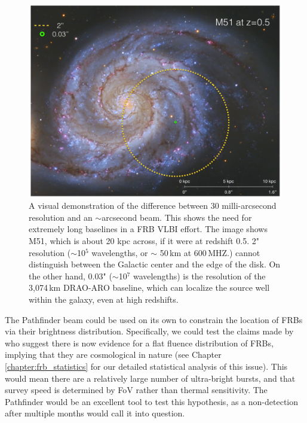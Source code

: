 \begin{figure}[!h]
\begin{center}
\includegraphics[trim={0in, 0in, 0in, 0in}, width=\textwidth]{./figures/beamforming/m51green.jpeg}
\caption[abc]{A visual demonstration of the difference between 
     30 milli-arcsecond resolution and an $\sim$arcsecond beam.
     This shows the need for extremely long baselines 
     in a FRB VLBI effort.
     The image shows M51, which is about 20 kpc across, if it
     were at redshift 0.5. 2" resolution ($\sim$10$^5$ wavelengths, or $\sim$
     50\,km at 600\,MHZ.) cannot distinguish between the 
     Galactic center and the edge of the disk. On the other hand,
     0.03" ($\sim$10$^7$ wavelengths)
     is the resolution of the 3,074\,km DRAO-ARO baseline,  
     which can localize the source well within the galaxy, even at 
     high redshifts.}  
\label{fig-m51}
\end{center}
\end{figure}

The Pathfinder beam could be used on its own to constrain 
the location of FRBs via their brightness distribution.
Specifically, we could test the claims made by
\citet{2016arXiv160606795V} who suggest there is now evidence 
for a flat fluence distribution of FRBs, implying 
that they are cosmological in nature 
(see Chapter \ref{chapter:frb_statistics} for our detailed statistical
analysis of this issue). 
This would mean there are a relatively large number of 
ultra-bright bursts, 
and that survey speed is determined by FoV rather than 
thermal sensitivity. The Pathfinder would be an excellent 
tool to test this hypothesis, as a non-detection after multiple months 
would call it into question. 

